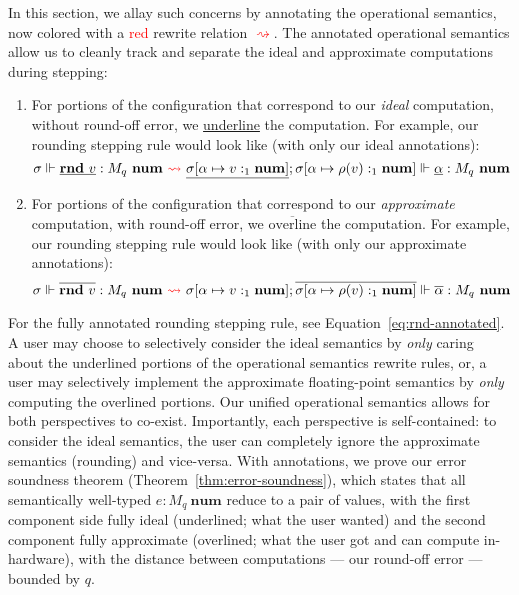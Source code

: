 In this section, we allay such concerns by annotating the operational semantics,
now colored with a \textcolor{red}{red} rewrite relation
\textcolor{red}{$\rightsquigarrow$}. The annotated operational semantics allow
us to cleanly track and separate the ideal and approximate computations during
stepping:
\begin{enumerate}
  \item For portions of the configuration that correspond to our \textit{ideal}
    computation, without round-off error, we \underline{underline} the
    computation. For example, our rounding stepping rule would look like (with
    only our ideal annotations):
    \begin{equation*}
      \sigma \Vdash \underline{\mathbf{rnd} \ v} : M_q \ \mathbf{num} \ \textcolor{red}{\rightsquigarrow} \
      \underline{\sigma [\alpha \mapsto v :_1 \mathbf{num}]}; \sigma [\alpha \mapsto \rho(v) :_1
      \mathbf{num}] \Vdash \underline{\alpha} : M_q \ \mathbf{num}
    \end{equation*}
  \item For portions of the configuration that correspond to our
    \textit{approximate} computation, with round-off error, we
    $\overline{\text{overline}}$ the computation. For example, our rounding
    stepping rule would look like (with only our approximate annotations):
    \begin{equation*}
      \sigma \Vdash \overline{\mathbf{rnd} \ v} : M_q \ \mathbf{num} \ \textcolor{red}{\rightsquigarrow} \ \sigma
      [\alpha \mapsto v :_1 \mathbf{num}]; \overline{\sigma [\alpha \mapsto \rho(v) :_1
      \mathbf{num}]} \Vdash \overline{\alpha} : M_q \ \mathbf{num}
    \end{equation*}
\end{enumerate}
For the fully annotated rounding stepping rule, see
Equation~\ref{eq:rnd-annotated}.
A user may choose to selectively consider the ideal semantics by \textit{only}
caring about the underlined portions of the operational semantics rewrite rules,
or, a user may selectively implement the approximate floating-point semantics by
\textit{only} computing the overlined portions. Our unified operational
semantics allows for both perspectives to co-exist.
Importantly, each perspective is self-contained: to consider the ideal
semantics, the user can completely ignore the approximate semantics (rounding)
and vice-versa.
With annotations, we prove our error soundness theorem
(Theorem~\ref{thm:error-soundness}), which states that all semantically
well-typed $e : M_q \ \mathbf{num}$ reduce to a pair of values, with the first
component side fully ideal (underlined; what the user wanted) and the second component fully
approximate (overlined; what the user got and can compute in-hardware), with the distance
between computations --- our round-off error --- bounded by $q$.

